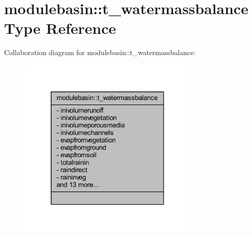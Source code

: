 \hypertarget{structmodulebasin_1_1t__watermassbalance}{}\section{modulebasin\+:\+:t\+\_\+watermassbalance Type Reference}
\label{structmodulebasin_1_1t__watermassbalance}


Collaboration diagram for modulebasin\+:\+:t\+\_\+watermassbalance\+:\nopagebreak
\begin{figure}[H]
\begin{center}
\leavevmode
\includegraphics[width=247pt]{structmodulebasin_1_1t__watermassbalance__coll__graph}
\end{center}
\end{figure}
